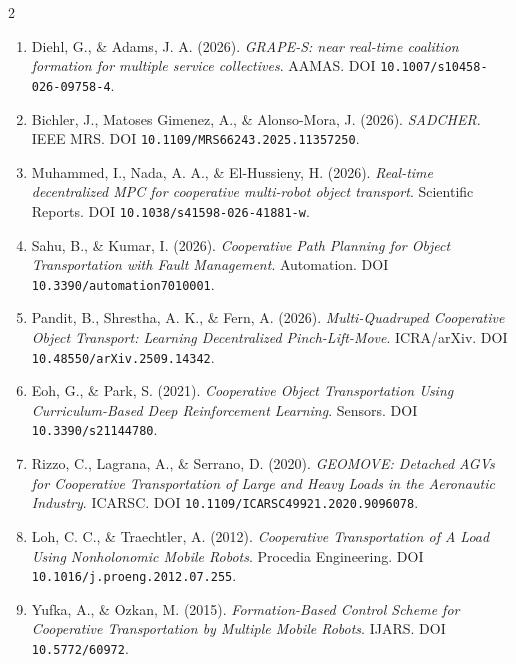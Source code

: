 \documentclass[10pt,letterpaper]{article}
\begin{document}
\begin{multicols}{2}
\begin{enumerate}[leftmargin=3.7mm,itemsep=0pt,topsep=0pt,parsep=0pt,partopsep=0pt]
\item Diehl, G., \& Adams, J. A. (2026). \textit{GRAPE-S: near real-time coalition formation for multiple service collectives}. AAMAS. DOI \nolinkurl{10.1007/s10458-026-09758-4}.
\item Bichler, J., Matoses Gimenez, A., \& Alonso-Mora, J. (2026). \textit{SADCHER}. IEEE MRS. DOI \nolinkurl{10.1109/MRS66243.2025.11357250}.
\item Muhammed, I., Nada, A. A., \& El-Hussieny, H. (2026). \textit{Real-time decentralized MPC for cooperative multi-robot object transport}. Scientific Reports. DOI \nolinkurl{10.1038/s41598-026-41881-w}.
\item Sahu, B., \& Kumar, I. (2026). \textit{Cooperative Path Planning for Object Transportation with Fault Management}. Automation. DOI \nolinkurl{10.3390/automation7010001}.
\item Pandit, B., Shrestha, A. K., \& Fern, A. (2026). \textit{Multi-Quadruped Cooperative Object Transport: Learning Decentralized Pinch-Lift-Move}. ICRA/arXiv. DOI \nolinkurl{10.48550/arXiv.2509.14342}.
\item Eoh, G., \& Park, S. (2021). \textit{Cooperative Object Transportation Using Curriculum-Based Deep Reinforcement Learning}. Sensors. DOI \nolinkurl{10.3390/s21144780}.
\item Rizzo, C., Lagrana, A., \& Serrano, D. (2020). \textit{GEOMOVE: Detached AGVs for Cooperative Transportation of Large and Heavy Loads in the Aeronautic Industry}. ICARSC. DOI \nolinkurl{10.1109/ICARSC49921.2020.9096078}.
\item Loh, C. C., \& Traechtler, A. (2012). \textit{Cooperative Transportation of A Load Using Nonholonomic Mobile Robots}. Procedia Engineering. DOI \nolinkurl{10.1016/j.proeng.2012.07.255}.
\item Yufka, A., \& Ozkan, M. (2015). \textit{Formation-Based Control Scheme for Cooperative Transportation by Multiple Mobile Robots}. IJARS. DOI \nolinkurl{10.5772/60972}.
\end{enumerate}
\end{multicols}
\end{document}
